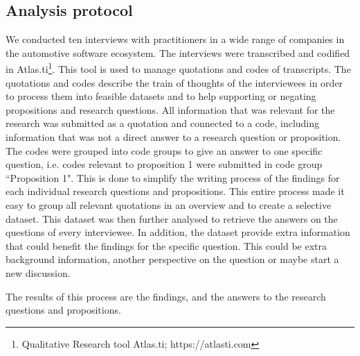 \subsection{Analysis protocol}
We conducted ten interviews with practitioners in a wide range of companies in the automotive software ecosystem. The interviews were transcribed and codified in Atlas.ti\footnote{Qualitative Research tool Atlas.ti; https://atlasti.com}. This tool is used to manage quotations and codes of transcripts. The quotations and codes describe the train of thoughts of the interviewees in order to process them into feasible datasets and to help supporting or negating propositions and research questions. All information that was relevant for the research was submitted as a quotation and connected to a code, including information that was not a direct answer to a research question or proposition. The codes were grouped into code groups to give an answer to one specific question, i.e. codes relevant to proposition 1 were submitted in code group ``Proposition 1". This is done to simplify the writing process of the findings for each individual research questions and propositions. This entire process made it easy to group all relevant quotations in an overview and to create a selective dataset. This dataset was then further analysed to retrieve the answers on the questions of every interviewee. In addition, the dataset provide extra information that could benefit the findings for the specific question. This could be extra background information, another perspective on the question or maybe start a new discussion. 

The results of this process are the findings, and the answers to the research questions and propositions.

